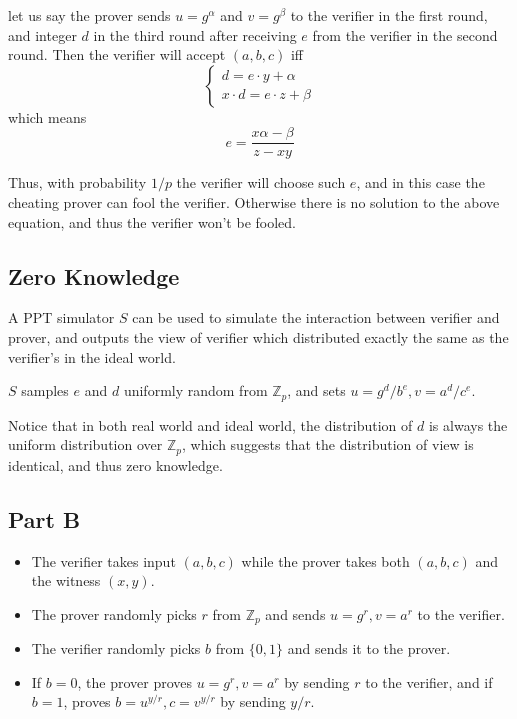 \documentclass[8pt]{article}
\theoremstyle{compact}
\begin{document}
let us say the prover sends $u = g^{\alpha}$ and $v = g^{\beta}$ to the verifier in the first round, and integer $d$ in the third round after receiving $e$ from the verifier in the second round. Then the verifier will accept $(a, b, c)$ iff $$\begin{cases}
	d = e \cdot y + \alpha \\
	x \cdot d = e \cdot z + \beta
\end{cases}$$ which means $$e = \frac{x\alpha - \beta}{z - xy}$$

Thus, with probability $1/p$ the verifier will choose such $e$, and in this case the cheating prover can fool the verifier. Otherwise there is no solution to the above equation, and thus the verifier won't be fooled.

\subsection*{Zero Knowledge}

A PPT simulator $S$ can be used to simulate the interaction between verifier and prover, and outputs the view of verifier which distributed exactly the same as the verifier's in the ideal world.

$S$ samples $e$ and $d$ uniformly random from $\mathbb Z_p$, and sets $u = g^d / b^e, v = a^d / c^e$.

Notice that in both real world and ideal world, the distribution of $d$ is always the uniform distribution over $\mathbb Z_p$, which suggests that the distribution of view is identical, and thus zero knowledge.

\subsection*{Part B}

\begin{itemize}
	\item The verifier takes input $(a, b, c)$ while the prover takes both $(a, b, c)$ and the witness $(x, y)$.
	\item The prover randomly picks $r$ from $\mathbb Z_p$ and sends $u = g^r, v = a^r$ to the verifier.
	\item The verifier randomly picks $b$ from $\{0, 1\}$ and sends it to the prover.
	\item If $b = 0$, the prover proves $u = g^r, v = a^r$ by sending $r$ to the verifier, and if $b = 1$, proves $b = u^{y/r}, c = v^{y/r}$ by sending $y/r$.
\end{itemize}
\end{document}
